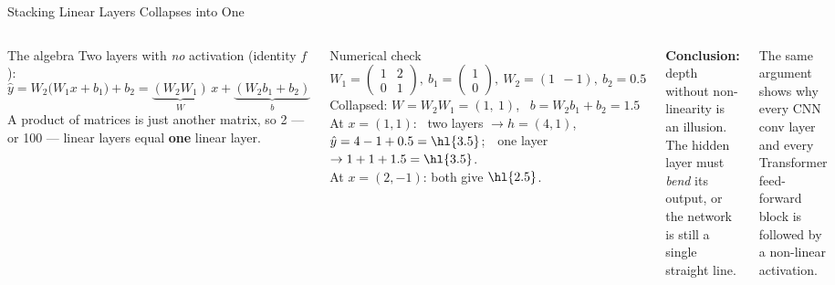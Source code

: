 \documentclass[aspectratio=169,10pt]{beamer}
\begin{document}
\begin{frame}{Stacking Linear Layers Collapses into One}
\begin{columns}[T]
\begin{cbox}{The algebra}
\scriptsize Two layers with \emph{no} activation (identity $f$):
\[
\hat y=W_2\bigl(W_1x+b_1\bigr)+b_2=\underbrace{(W_2W_1)}_{W}\,x+\underbrace{(W_2b_1+b_2)}_{b}
\]
A product of matrices is just another matrix, so 2 --- or 100 --- linear layers equal \textbf{one} linear layer.
\end{cbox}
\begin{cbox}{Numerical check}
\scriptsize $W_1=\begin{pmatrix}1&2\\0&1\end{pmatrix},\ b_1=\begin{pmatrix}1\\0\end{pmatrix},\ W_2=(1\ \ -1),\ b_2=0.5$\\[3pt]
Collapsed: $W=W_2W_1=(1,\ 1)$, \ $b=W_2b_1+b_2=1.5$\\[3pt]
At $x=(1,1)$: \ two layers $\to h=(4,1)$, $\hat y=4-1+0.5=\hl{3.5}$;\ \ one layer $\to 1+1+1.5=\hl{3.5}$.\\
At $x=(2,-1)$: both give $\hl{2.5}$.
\end{cbox}
\begin{wbox}\scriptsize\textbf{Conclusion:} depth without non-linearity is an illusion. The hidden layer must \emph{bend} its output, or the network is still a single straight line.\end{wbox}
\begin{ibox}\scriptsize The same argument shows why every CNN conv layer and every Transformer feed-forward block is followed by a non-linear activation.\end{ibox}
\end{columns}
\end{frame}
\end{document}
